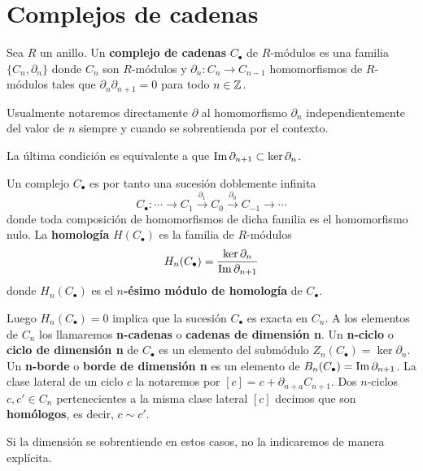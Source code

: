 \section{Complejos de cadenas}

\begin{definicion}
	Sea \(R\) un anillo. Un \textbf{complejo de cadenas} \(C_{\bullet}\) de \(R\)-módulos
	es una familia \(\{C_{n}, \partial_{n}\}\) donde \(C_{n}\) son \(R\)-módulos y \(\partial
	_{n}: C_{n}\rightarrow C_{n-1}\) homomorfismos de \(R\)-módulos tales que \(\partial
	_{n}\partial_{n+1}= 0\) para todo \(n \in \mathbb{Z}\).
\end{definicion}
\begin{nota}
	Usualmente notaremos directamente \(\partial\) al homomorfismo \(\partial_{n}\) independientemente
	del valor de \(n\) siempre y cuando se sobrentienda por el contexto.
\end{nota}
\begin{observacion}
	La última condición es equivalente a que \(\operatorname{Im}{\partial_{n+1}}\subset \ker{\partial_n}\).
\end{observacion}
Un complejo \(C_{\bullet}\) es por tanto una sucesión doblemente infinita
\[
C_{\bullet}: \cdots \rightarrow C_{1} \xrightarrow{\partial_1} C_{0} \xrightarrow{\partial_0} C_{-1} \rightarrow \cdots
\]
donde toda composición de homomorfismos de dicha familia es el homomorfismo nulo.
La \textbf{homología} \(H(C_{\bullet})\) es la familia de \(R\)-módulos
\[
H_{n}(C_{\bullet}) = \frac{\ker \partial_{n}}{\operatorname{Im} \partial_{n+1}}
\]
donde \(H_{n}(C_{\bullet})\) es el \textbf{\(n\)-ésimo módulo de homología} de
\(C_{\bullet}\).

Luego \(H_{n}(C_{\bullet})=0\) implica que la sucesión \(C_{\bullet}\) es exacta en
\(C_{n}\). A los elementos de \(C_{n}\) los llamaremos \textbf{n-cadenas} o \textbf{cadenas
	de dimensión n}. Un \textbf{n-ciclo} o \textbf{ciclo de dimensión n} de
\(C_{\bullet}\) es un elemento del submódulo
\(Z_{n}(C_{\bullet}) = \ker \partial_{n}\). Un \textbf{n-borde} o \textbf{borde de
	dimensión n} es un elemento de \(B_{n}(C_{\bullet})= \operatorname{Im}{\partial_{n+1}}\). La
clase lateral de un ciclo \(c\) la notaremos por \([c] = c + \partial_{n+a}C_{n+1}\).
Dos \(n\)-ciclos \(c,c' \in C_{n}\) pertenecientes a la misma clase lateral \([c]\) decimos
que son \textbf{homólogos}, es decir, \(c \sim c'\).

\begin{nota}
	Si la dimensión se sobrentiende en estos casos, no la indicaremos de manera
	explícita.
\end{nota}

